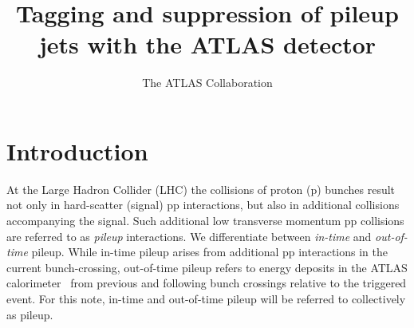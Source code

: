 \documentclass{atlasnote}
\title{Tagging and suppression of pileup jets with the ATLAS detector}
\author{The ATLAS Collaboration}
\begin{document}
\section{Introduction}
At the Large Hadron Collider (LHC) the collisions of proton (p) bunches result not only in hard-scatter (signal) pp interactions, but also
in additional collisions accompanying the signal. Such additional low transverse momentum pp collisions are referred 
to as {\it pileup} interactions. We differentiate between {\it in-time} and {\it out-of-time} pileup. While in-time 
pileup arises from additional pp interactions in the current bunch-crossing, out-of-time pileup refers to energy deposits in the ATLAS 
calorimeter~\cite{ATLAS:JINST} from previous and following bunch crossings relative to the triggered event.
For this note, in-time and out-of-time pileup will be referred to collectively as pileup.
\end{document}
